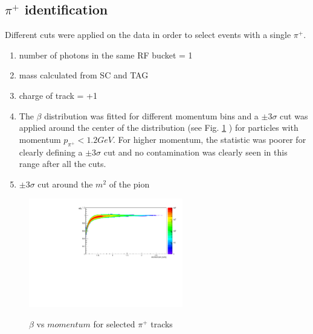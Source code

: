 \subsection{$\pi^+$ identification}
Different cuts were applied on the data in order to select events with a single $\pi^+$.
\begin{enumerate}
  \item number of photons in the same RF bucket = 1
  \item mass calculated from SC and TAG
  \item charge of track = +1
  \item The $\beta$ distribution was fitted for different momentum bins and a $\pm 3 \sigma$ cut was applied around the center of the distribution (see Fig. \ref{fig:beta_mom_pip} ) for particles with momentum $p_{\pi^+} < 1.2GeV$. For higher momentum, the statistic was poorer for clearly defining a $\pm 3 \sigma$ cut and no contamination was clearly seen in this range after all the cuts.
  \item  $\pm 3 \sigma$ cut around the $m^2$ of the pion
\end{enumerate}
\begin{figure}[htb]
  \begin{center}
    \includegraphics[width=0.6\textwidth]{figures/pid_beta_mom_pip.pdf} \\
    \caption{$\beta$ vs $momentum$ for selected $\pi^+$ tracks}
    \label{fig:beta_mom_pip}
  \end{center}
\end{figure}

